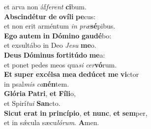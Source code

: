 \evenverse et arva non áf\textit{fe}\textit{rent} \textbf{ci}bum.\\
\oddverse \textbf{Ab}\textbf{scin}\textbf{dé}\textbf{tur} \textbf{de} \textbf{o}\textbf{ví}\textbf{li} \textbf{pe}cus:~\*\\
\oddverse et non erit arméntum \textit{in} \textit{præ}\textbf{sé}pibus.\\
\evenverse \textbf{E}\textbf{go} \textbf{au}\textbf{tem} \textbf{in} \textbf{Dó}\textbf{mi}\textbf{no} \textbf{gau}\textbf{dé}bo:~\*\\
\evenverse et exsultábo in Deo \textit{Je}\textit{su} \textbf{me}o.\\
\oddverse \textbf{De}\textbf{us} \textbf{Dó}\textbf{mi}\textbf{nus} \textbf{for}\textbf{ti}\textbf{tú}\textbf{do} \textbf{me}a:~\*\\
\oddverse et ponet pedes meos qua\textit{si} \textit{cer}\textbf{vó}rum.\\
\evenverse \textbf{Et} \textbf{su}\textbf{per} \textbf{ex}\textbf{cél}\textbf{sa} \textbf{me}\textbf{a} \textbf{de}\textbf{dú}\textbf{cet} \textbf{me} \textbf{vi}ctor~\*\\
\evenverse in psal\textit{mis} \textit{ca}\textbf{nén}tem.\\
\oddverse \textbf{Gló}\textbf{ri}\textbf{a} \textbf{Pa}\textbf{tri}, \textbf{et} \textbf{Fí}\textbf{li}o,~\*\\
\oddverse et Spirí\textit{tu}\textit{i} \textbf{San}cto.\\
\evenverse \textbf{Si}\textbf{cut} \textbf{e}\textbf{rat} \textbf{in} \textbf{prin}\textbf{cí}\textbf{pi}\textbf{o}, \textbf{et} \textbf{nunc}, \textbf{et} \textbf{sem}per,~\*\\
\evenverse et in sǽcula sæcu\textit{ló}\textit{rum}. \textbf{A}men.\\
